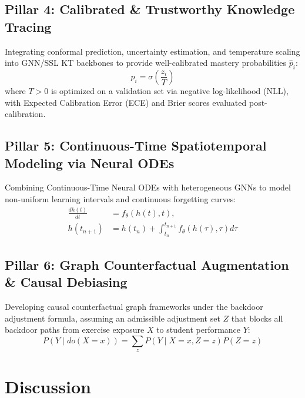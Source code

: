 \documentclass[10pt,journal,compsoc]{IEEEtran}
\begin{document}
\subsection{Pillar 4: Calibrated \& Trustworthy Knowledge Tracing}
Integrating conformal prediction, uncertainty estimation, and temperature scaling into GNN/SSL KT backbones to provide well-calibrated mastery probabilities $\hat{p}_i$:
\begin{equation}
\hat{p}_i = \sigma\left(\frac{z_i}{T}\right)
\end{equation}
where $T > 0$ is optimized on a validation set via negative log-likelihood (NLL), with Expected Calibration Error (ECE) and Brier scores evaluated post-calibration.

\subsection{Pillar 5: Continuous-Time Spatiotemporal Modeling via Neural ODEs}
Combining Continuous-Time Neural ODEs with heterogeneous GNNs to model non-uniform learning intervals and continuous forgetting curves:
\begin{equation}
\begin{split}
\frac{dh(t)}{dt} &= f_\theta(h(t), t), \\
h(t_{n+1}) &= h(t_n) + \int_{t_n}^{t_{n+1}} f_\theta(h(\tau), \tau) d\tau
\end{split}
\end{equation}

\subsection{Pillar 6: Graph Counterfactual Augmentation \& Causal Debiasing}
Developing causal counterfactual graph frameworks under the backdoor adjustment formula, assuming an admissible adjustment set $Z$ that blocks all backdoor paths from exercise exposure $X$ to student performance $Y$:
\begin{equation}
P(Y \mid do(X = x)) = \sum_{z} P(Y \mid X = x, Z = z) P(Z = z)
\end{equation}

\section{Discussion}
\end{document}
